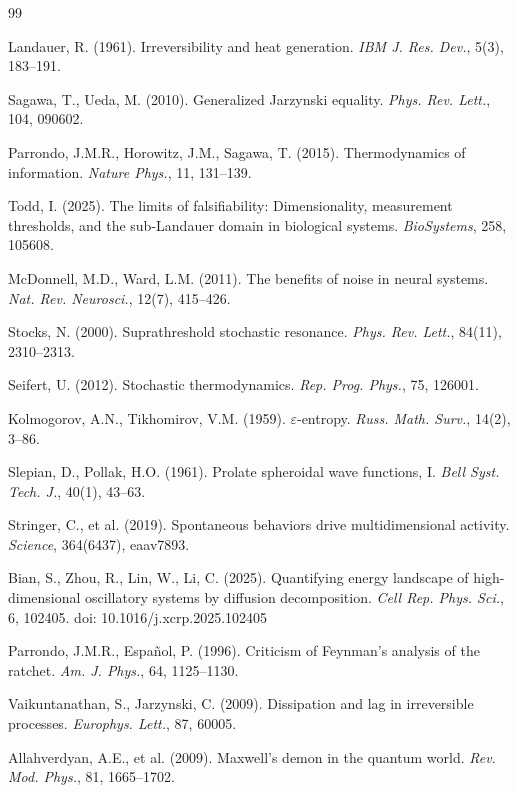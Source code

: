 \documentclass[12pt]{article}
\numberwithin{equation}{section}
\begin{document}
\begin{thebibliography}{99}

Landauer, R. (1961). Irreversibility and heat generation. \textit{IBM J. Res. Dev.}, 5(3), 183--191.

Sagawa, T., Ueda, M. (2010). Generalized Jarzynski equality. \textit{Phys. Rev. Lett.}, 104, 090602.

Parrondo, J.M.R., Horowitz, J.M., Sagawa, T. (2015). Thermodynamics of information. \textit{Nature Phys.}, 11, 131--139.

Todd, I. (2025). The limits of falsifiability: Dimensionality, measurement thresholds, and the sub-Landauer domain in biological systems. \textit{BioSystems}, 258, 105608.

McDonnell, M.D., Ward, L.M. (2011). The benefits of noise in neural systems. \textit{Nat. Rev. Neurosci.}, 12(7), 415--426.

Stocks, N. (2000). Suprathreshold stochastic resonance. \textit{Phys. Rev. Lett.}, 84(11), 2310--2313.

Seifert, U. (2012). Stochastic thermodynamics. \textit{Rep. Prog. Phys.}, 75, 126001.

Kolmogorov, A.N., Tikhomirov, V.M. (1959). $\varepsilon$-entropy. \textit{Russ. Math. Surv.}, 14(2), 3--86.

Slepian, D., Pollak, H.O. (1961). Prolate spheroidal wave functions, I. \textit{Bell Syst. Tech. J.}, 40(1), 43--63.

Stringer, C., et al. (2019). Spontaneous behaviors drive multidimensional activity. \textit{Science}, 364(6437), eaav7893.

Bian, S., Zhou, R., Lin, W., Li, C. (2025). Quantifying energy landscape of high-dimensional oscillatory systems by diffusion decomposition. \textit{Cell Rep. Phys. Sci.}, 6, 102405. doi: 10.1016/j.xcrp.2025.102405

Parrondo, J.M.R., Español, P. (1996). Criticism of Feynman's analysis of the ratchet. \textit{Am. J. Phys.}, 64, 1125--1130.

Vaikuntanathan, S., Jarzynski, C. (2009). Dissipation and lag in irreversible processes. \textit{Europhys. Lett.}, 87, 60005.

Allahverdyan, A.E., et al. (2009). Maxwell's demon in the quantum world. \textit{Rev. Mod. Phys.}, 81, 1665--1702.


\end{thebibliography}
\end{document}

